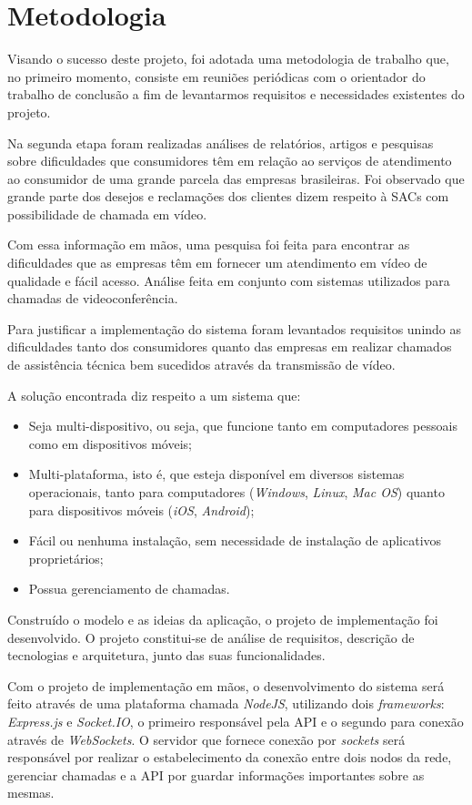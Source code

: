 \section{Metodologia}
Visando o sucesso deste projeto, foi adotada uma metodologia de trabalho que, no primeiro momento, consiste em reuniões periódicas com o orientador do trabalho de conclusão a fim de levantarmos requisitos e necessidades existentes do projeto.

Na segunda etapa foram realizadas análises de relatórios, artigos e pesquisas sobre dificuldades que consumidores têm em relação ao serviços de atendimento ao consumidor de uma grande parcela das empresas brasileiras. Foi observado que grande parte dos desejos e reclamações dos clientes dizem respeito à SACs com possibilidade de chamada em vídeo.

Com essa informação em mãos, uma pesquisa foi feita para encontrar as dificuldades que as empresas têm em fornecer um atendimento em vídeo de qualidade e fácil acesso. Análise feita em conjunto com sistemas utilizados para chamadas de videoconferência.

Para justificar a implementação do sistema foram levantados requisitos unindo as dificuldades tanto dos consumidores quanto das empresas em realizar chamados de assistência técnica bem sucedidos através da transmissão de vídeo. 

A solução encontrada diz respeito a um sistema que:
\begin{itemize}
\item Seja multi-dispositivo, ou seja, que funcione tanto em computadores pessoais como em dispositivos móveis;
\item Multi-plataforma, isto é, que esteja disponível em diversos sistemas operacionais, tanto para computadores (\textit{Windows}, \textit{Linux}, \textit{Mac OS}) quanto para dispositivos móveis (\textit{iOS}, \textit{Android});
\item Fácil ou nenhuma instalação, sem necessidade de instalação de aplicativos proprietários;
\item Possua gerenciamento de chamadas.
\end{itemize}

Construído o modelo e as ideias da aplicação, o projeto de implementação foi desenvolvido. O projeto constitui-se de análise de requisitos, descrição de tecnologias e arquitetura, junto das suas funcionalidades.

Com o projeto de implementação em mãos, o desenvolvimento do sistema será feito através de uma plataforma chamada \textit{NodeJS}, utilizando dois \textit{frameworks}: \textit{Express.js} e \textit{Socket.IO}, o primeiro responsável pela API e o segundo para conexão através de \textit{WebSockets}. O  servidor que fornece conexão por \textit{sockets} será responsável por realizar o estabelecimento da conexão entre dois nodos da rede, gerenciar chamadas e a API por guardar informações importantes sobre as mesmas.

